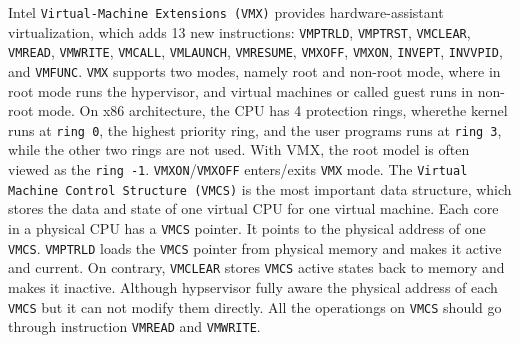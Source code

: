 



Intel \texttt{Virtual-Machine Extensions (VMX)} provides hardware-assistant virtualization, which adds 13 new instructions: \texttt{VMPTRLD}, \texttt{VMPTRST}, \texttt{VMCLEAR}, \texttt{VMREAD}, \texttt{VMWRITE}, \texttt{VMCALL}, \texttt{VMLAUNCH}, \texttt{VMRESUME}, \texttt{VMXOFF}, \texttt{VMXON}, \texttt{INVEPT}, \texttt{INVVPID}, and \texttt{VMFUNC}. \texttt{VMX} supports two modes, namely root and non-root mode, where in root mode runs the hypervisor, and virtual machines or called guest runs in non-root mode. On x86 architecture, the CPU has 4 protection rings, wherethe kernel runs at \texttt{ring 0}, the highest priority ring, and the user programs runs at \texttt{ring 3}, while the other two rings are not used. With VMX, the root model is often viewed as the \texttt{ring -1}. \texttt{VMXON}/\texttt{VMXOFF} enters/exits \texttt{VMX} mode. The \texttt{Virtual Machine Control Structure (VMCS)} is the most important data structure, which stores the data and state of one virtual CPU for one virtual machine. Each core in a physical CPU has a \texttt{VMCS} pointer. It points to the physical address of one \texttt{VMCS}. \texttt{VMPTRLD} loads the \texttt{VMCS} pointer from physical memory and makes it active and current. On contrary, \texttt{VMCLEAR} stores \texttt{VMCS} active states back to memory and makes it inactive. Although hypservisor fully aware the physical address of each \texttt{VMCS} but it can not modify them directly. All the operationgs on \texttt{VMCS} should go through instruction \texttt{VMREAD} and \texttt{VMWRITE}.



